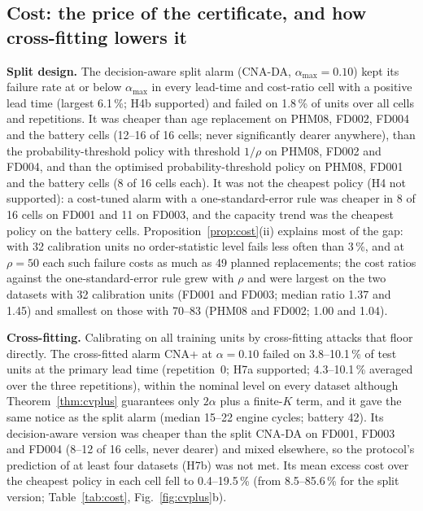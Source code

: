 \subsection{Cost: the price of the certificate, and how cross-fitting lowers it}\label{sec:res-cost}

\textbf{Split design.} The decision-aware split alarm (CNA-DA, $\alpha_{\max}=0.10$) kept its failure rate at or below $\alpha_{\max}$ in every lead-time and cost-ratio cell with a positive lead time (largest 6.1\,\%; H4b supported) and failed on 1.8\,\% of units over all cells and repetitions. It was cheaper than age replacement on PHM08, FD002, FD004 and the battery cells (12--16 of 16 cells; never significantly dearer anywhere), than the probability-threshold policy with threshold $1/\rho$ on PHM08, FD002 and FD004, and than the optimised probability-threshold policy on PHM08, FD001 and the battery cells (8 of 16 cells each). It was not the cheapest policy (H4 not supported): a cost-tuned alarm with a one-standard-error rule was cheaper in 8 of 16 cells on FD001 and 11 on FD003, and the capacity trend was the cheapest policy on the battery cells. Proposition~\ref{prop:cost}(ii) explains most of the gap: with 32 calibration units no order-statistic level fails less often than 3\,\%, and at $\rho=50$ each such failure costs as much as 49 planned replacements; the cost ratios against the one-standard-error rule grew with $\rho$ and were largest on the two datasets with 32 calibration units (FD001 and FD003; median ratio 1.37 and 1.45) and smallest on those with 70--83 (PHM08 and FD002; 1.00 and 1.04).

\textbf{Cross-fitting.} Calibrating on all training units by cross-fitting attacks that floor directly. The cross-fitted alarm CNA+ at $\alpha=0.10$ failed on 3.8--10.1\,\% of test units at the primary lead time (repetition~0; H7a supported; 4.3--10.1\,\% averaged over the three repetitions), within the nominal level on every dataset although Theorem~\ref{thm:cvplus} guarantees only $2\alpha$ plus a finite-$K$ term, and it gave the same notice as the split alarm (median 15--22 engine cycles; battery 42). Its decision-aware version was cheaper than the split CNA-DA on FD001, FD003 and FD004 (8--12 of 16 cells, never dearer) and mixed elsewhere, so the protocol's prediction of at least four datasets (H7b) was not met. Its mean excess cost over the cheapest policy in each cell fell to 0.4--19.5\,\% (from 8.5--85.6\,\% for the split version; Table~\ref{tab:cost}, Fig.~\ref{fig:cvplus}b).

